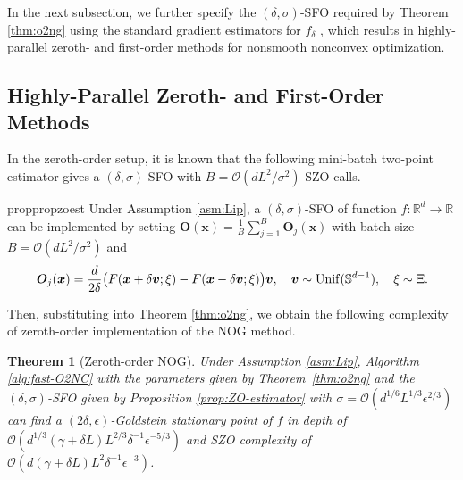 \documentclass{article}
\def\vv{{\bm{v}}}
\def\vx{{\bm{x}}}
\def\mO{{\bm{O}}}
\def\gO{{\mathcal{O}}}
\def\sR{{\mathbb{R}}}
\def\sS{{\mathbb{S}}}
\newtheorem{thm}{Theorem}[section]
\theoremstyle{definition}
\theoremstyle{remark}
\begin{document}
	
	In the next subsection, we further specify the $(\delta,\sigma)$-SFO required by Theorem \ref{thm:o2ng} using the standard gradient estimators for $f_\delta$ \citep{yousefian2012stochastic,duchi2012randomized,duchi2015optimal,shamir2017optimal,lin2022gradient,sahinoglu2024online,kornowski2024algorithm}, which results in highly-parallel zeroth- and first-order methods for nonsmooth nonconvex optimization.
	
	\subsection{Highly-Parallel Zeroth- and First-Order Methods}
	\label{subsec:algo}
	In the zeroth-order setup, it is known that the following mini-batch two-point estimator \citep{duchi2015optimal,shamir2017optimal,lin2022gradient,kornowski2024algorithm,sahinoglu2024online} gives a $(\delta,\sigma)$-SFO with $B = \gO(d L^2 / \sigma^2)$ SZO calls.
	
	\begin{restatable} {prop}{propzoest}\label{prop:ZO-estimator}
		Under Assumption \ref{asm:Lip},
		a $(\delta, \sigma)$-SFO of function $f:\sR^d \rightarrow \sR$ can be implemented by setting $\mO(\vx) = 
		\frac{1}{B} \sum_{j=1}^B \mO_j(\vx)$ with batch size $B = \gO(d L^2 /\sigma^2)$ and
		\begin{align*}
			\mO_j(\vx) = 
			\frac{d}{2 \delta}\bigl(F(\vx + \delta \vv;\xi ) - F(\vx - \delta \vv;\xi)\bigr)\vv,
			\quad \vv \sim {\rm Unif}(\sS^{d-1}), \quad \xi \sim \Xi.
		\end{align*}
	\end{restatable}
	
	Then, substituting into Theorem \ref{thm:o2ng}, we obtain the following complexity of zeroth-order implementation of the NOG method.
	
	\begin{thm}[Zeroth-order NOG] \label{thm:parallel-ZO}
		Under Assumption \ref{asm:Lip}, Algorithm \ref{alg:fast-O2NC} with the parameters given by Theorem~\ref{thm:o2ng} and the $(\delta,\sigma)$-SFO given by Proposition \ref{prop:ZO-estimator} with $\sigma = \gO(d^{1/6} L^{1/3} \epsilon^{2/3})$ can find a $(2\delta,\epsilon)$-Goldstein stationary point of $f$ in  depth of
		$\gO(d^{1/3} (\gamma + \delta L) L^{2/3} \delta^{-1} \epsilon^{-5/3})$ and SZO complexity of
		$\gO( d (\gamma + \delta L) L^2 \delta^{-1} \epsilon^{-3}  )$.
	\end{thm}
	
\end{document}
